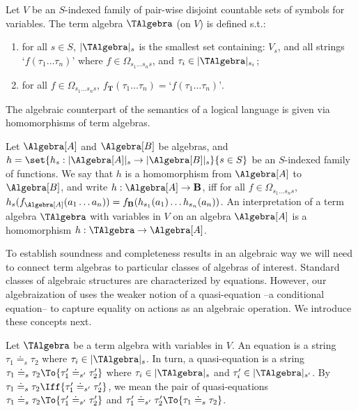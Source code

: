\medskip
\begin{definition}\label{def:talg}
	Let $V$ be an $S$-indexed family of pair-wise disjoint countable sets of symbols for variables.
	The term algebra $\TAlgebra$ (on $V$) is defined s.t.:
	
	\medskip
	\begin{enumerate}%
		\item for all $s \in S$, $|\TAlgebra|_s$ is the smallest set containing:
			$V_s$, and
			all strings $\textrm{`}f(\tau_1 \dots \tau_n)\textrm{'}$ where $f \in \Omega_{s_1 \dots s_n s}$, and $\tau_i \in |\TAlgebra|_{s_i}$;
		\item for all $f \in \Omega_{s_1 \dots s_n s}$,
			$f_{\mathbf{T}}(\tau_1 \dots \tau_n) = \textrm{`}f(\tau_1 \dots \tau_n)\textrm{'}$.
	\end{enumerate}
\end{definition}
\medskip

The algebraic counterpart of the semantics of a logical language is given via homomorphisms of term algebras.

\medskip
\begin{definition}
	Let $\Algebra[A]$ and $\Algebra[B]$ be algebras, and $h = {\set{h_s : {|\Algebra[A]|_s \rightarrow |\Algebra[B]|_s}}{s \in S}}$ be an $S$-indexed family of functions.
	We say that $h$ is a homomor\-phism from $\Algebra[A]$ to $\Algebra[B]$, and write ${h: {\Algebra[A] \to \mathbf{B}}}$, iff for all $f \in \Omega_{s_1 \dots s_n s}$, $h_s(f_{\Algebra[A]}(a_1 \dots a_n)) = f_{\mathbf{B}}(h_{s_1}(a_1) \dots h_{s_n}(a_n))$.
	An interpretation of a term algebra $\TAlgebra$ with variables in $V$ on an algebra $\Algebra[A]$ is a homomorphism $h: \TAlgebra \to \Algebra[A]$.
\end{definition}
\medskip

To establish soundness and completeness results in an algebraic way we will need to connect term algebras to particular classes of algebras of interest.
Standard classes of algebraic structures are characterized by equations. However, our algebraization of \DAL uses the weaker notion of a quasi-equation --a conditional equation-- to capture equality on actions as an algebraic operation. We introduce these concepts next.

\medskip 
\begin{definition}
	Let $\TAlgebra$ be a term algebra with variables in $V$.
	An equation is a string ${\tau_1 \doteq_s \tau_2}$ where $\tau_i \in |\TAlgebra|_s$. 
	In turn, a quasi-equation is a string ${{\tau_1 \doteq_s
	\tau_2} \To {\tau'_1 \doteq_{s'} \tau'_2}}$ where $\tau_i \in |\TAlgebra|_s$ and $\tau'_i \in |\TAlgebra|_{s'}$.
	By ${{\tau_1 \doteq_s
	\tau_2} \Iff {\tau'_1 \doteq_{s'} \tau'_2}}$, we mean the pair of quasi-equations
		${\tau_1 \doteq_s \tau_2} \To {\tau'_1 \doteq_{s'} \tau'_2}$ and
		${\tau'_1 \doteq_{s'} \tau'_2} \To {\tau_1 \doteq_{s} \tau_2}$.
\end{definition}
\medskip 

